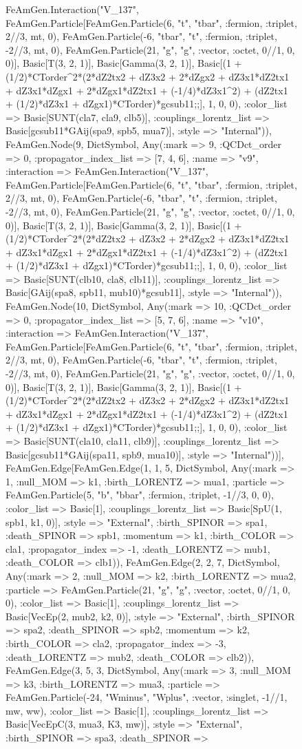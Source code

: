 \documentclass{revtex4}
\begin{document}
\begin{figure}[!htb]
\begin{center}
{FeAmGen.Interaction("V_137", FeAmGen.Particle[FeAmGen.Particle(6, "t", "tbar", :fermion, :triplet, 2//3, mt, 0), FeAmGen.Particle(-6, "tbar", "t", :fermion, :triplet, -2//3, mt, 0), FeAmGen.Particle(21, "g", "g", :vector, :octet, 0//1, 0, 0)], Basic[T(3, 2, 1)], Basic[Gamma(3, 2, 1)], Basic[(1 + (1/2)*CTorder^2*(2*dZ2tx2 + dZ3x2 + 2*dZgx2 + dZ3x1*dZ2tx1 + dZ3x1*dZgx1 + 2*dZgx1*dZ2tx1 + (-1/4)*dZ3x1^2) + (dZ2tx1 + (1/2)*dZ3x1 + dZgx1)*CTorder)*gcsub11;;], 1, 0, 0), :color_list => Basic[SUNT(cla7, cla9, clb5)], :couplings_lorentz_list => Basic[gcsub11*GAij(spa9, spb5, mua7)], :style => "Internal")), FeAmGen.Node(9, Dict{Symbol, Any}(:mark => 9, :QCDct_order => 0, :propagator_index_list => [7, 4, 6], :name => "v9", :interaction => FeAmGen.Interaction("V_137", FeAmGen.Particle[FeAmGen.Particle(6, "t", "tbar", :fermion, :triplet, 2//3, mt, 0), FeAmGen.Particle(-6, "tbar", "t", :fermion, :triplet, -2//3, mt, 0), FeAmGen.Particle(21, "g", "g", :vector, :octet, 0//1, 0, 0)], Basic[T(3, 2, 1)], Basic[Gamma(3, 2, 1)], Basic[(1 + (1/2)*CTorder^2*(2*dZ2tx2 + dZ3x2 + 2*dZgx2 + dZ3x1*dZ2tx1 + dZ3x1*dZgx1 + 2*dZgx1*dZ2tx1 + (-1/4)*dZ3x1^2) + (dZ2tx1 + (1/2)*dZ3x1 + dZgx1)*CTorder)*gcsub11;;], 1, 0, 0), :color_list => Basic[SUNT(clb10, cla8, clb11)], :couplings_lorentz_list => Basic[GAij(spa8, spb11, mub10)*gcsub11], :style => "Internal")), FeAmGen.Node(10, Dict{Symbol, Any}(:mark => 10, :QCDct_order => 0, :propagator_index_list => [5, 7, 6], :name => "v10", :interaction => FeAmGen.Interaction("V_137", FeAmGen.Particle[FeAmGen.Particle(6, "t", "tbar", :fermion, :triplet, 2//3, mt, 0), FeAmGen.Particle(-6, "tbar", "t", :fermion, :triplet, -2//3, mt, 0), FeAmGen.Particle(21, "g", "g", :vector, :octet, 0//1, 0, 0)], Basic[T(3, 2, 1)], Basic[Gamma(3, 2, 1)], Basic[(1 + (1/2)*CTorder^2*(2*dZ2tx2 + dZ3x2 + 2*dZgx2 + dZ3x1*dZ2tx1 + dZ3x1*dZgx1 + 2*dZgx1*dZ2tx1 + (-1/4)*dZ3x1^2) + (dZ2tx1 + (1/2)*dZ3x1 + dZgx1)*CTorder)*gcsub11;;], 1, 0, 0), :color_list => Basic[SUNT(cla10, cla11, clb9)], :couplings_lorentz_list => Basic[gcsub11*GAij(spa11, spb9, mua10)], :style => "Internal"))], FeAmGen.Edge[FeAmGen.Edge(1, 1, 5, Dict{Symbol, Any}(:mark => 1, :null_MOM => k1, :birth_LORENTZ => mua1, :particle => FeAmGen.Particle(5, "b", "bbar", :fermion, :triplet, -1//3, 0, 0), :color_list => Basic[1], :couplings_lorentz_list => Basic[SpU(1, spb1, k1, 0)], :style => "External", :birth_SPINOR => spa1, :death_SPINOR => spb1, :momentum => k1, :birth_COLOR => cla1, :propagator_index => -1, :death_LORENTZ => mub1, :death_COLOR => clb1)), FeAmGen.Edge(2, 2, 7, Dict{Symbol, Any}(:mark => 2, :null_MOM => k2, :birth_LORENTZ => mua2, :particle => FeAmGen.Particle(21, "g", "g", :vector, :octet, 0//1, 0, 0), :color_list => Basic[1], :couplings_lorentz_list => Basic[VecEp(2, mub2, k2, 0)], :style => "External", :birth_SPINOR => spa2, :death_SPINOR => spb2, :momentum => k2, :birth_COLOR => cla2, :propagator_index => -3, :death_LORENTZ => mub2, :death_COLOR => clb2)), FeAmGen.Edge(3, 5, 3, Dict{Symbol, Any}(:mark => 3, :null_MOM => k3, :birth_LORENTZ => mua3, :particle => FeAmGen.Particle(-24, "Wminus", "Wplus", :vector, :singlet, -1//1, mw, ww), :color_list => Basic[1], :couplings_lorentz_list => Basic[VecEpC(3, mua3, K3, mw)], :style => "External", :birth_SPINOR => spa3, :death_SPINOR => }
\end{center}
\end{figure}
\end{document}

